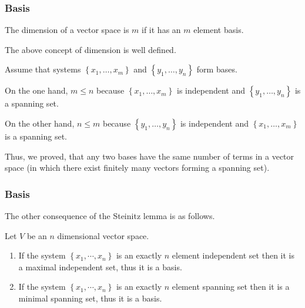 \begin{frame}\frametitle{Basis}
\begin{definition}
The dimension of a vector space is $m$ if it has an $m$ element basis.
\end{definition}
The above concept of dimension is well defined.

Assume that systems $\left\{ x_1,\ldots,x_m \right\}$ and $\left\{ y_1,\ldots,y_n \right\}$ form bases.

On the one hand, $m\leq n$ because $\left\{ x_1,\ldots,x_m \right\}$ is independent and $\left\{ y_1,\ldots,y_n \right\}$ is a spanning set.

On the other hand, $n\leq m$ because $\left\{ y_1,\ldots,y_n \right\}$ is independent and $\left\{ x_1,\ldots,x_m \right\}$ is a spanning set.

Thus, we proved, that
\alert{any two bases have the same number of terms in a vector space}
(in which there exist finitely many vectors forming a spanning set).
\end{frame}

\begin{frame}\frametitle{Basis}
    The other consequence of the Steinitz lemma is as follows.
    \begin{proposition}
        Let $V$ be an $n$ dimensional vector space.
        \begin{enumerate}
            \item If the system $\left\{x_1,\cdots,x_n \right\}$ is an exactly $n$ element independent set
                then it is a maximal independent set, thus it is a basis.
            \item If the system $\left\{x_1,\cdots,x_n \right\}$ is an exactly $n$ element spanning set
                then it is a minimal spanning set, thus it is a basis.
        \end{enumerate}
    \end{proposition}
\end{frame}
